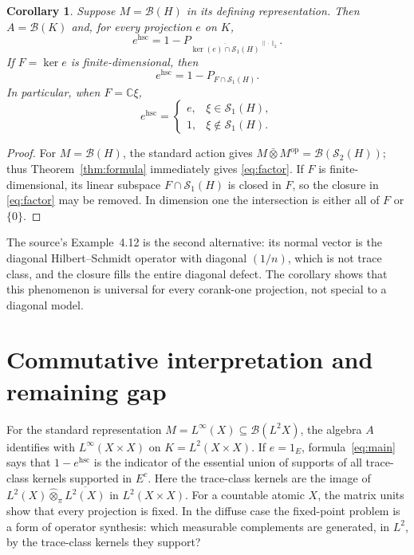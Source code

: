 \documentclass[11pt]{article}
\newtheorem{corollary}[theorem]{Corollary}
\newcommand{\HS}{\mathcal S_2}
\newcommand{\TC}{\mathcal S_1}
\begin{document}
\begin{corollary}\label{cor:factor}
Suppose $M=\mathcal B(H)$ in its defining representation.  Then
$A=\mathcal B(K)$ and, for every projection $e$ on $K$,
\begin{equation}\label{eq:factor}
 e^{\mathrm{hsc}}
 =1-P_{\overline{\ker(e)\cap\TC(H)}^{\,\|\cdot\|_2}}.
\end{equation}
If $F=\ker e$ is finite-dimensional, then
\begin{equation}\label{eq:finite}
                  e^{\mathrm{hsc}}=1-P_{F\cap\TC(H)}.
\end{equation}
In particular, when $F=\mathbb C\xi$,
\[
 e^{\mathrm{hsc}}=
 \begin{cases}
 e,&\xi\in\TC(H),\\
 1,&\xi\notin\TC(H).
 \end{cases}
\]
\end{corollary}

\begin{proof}
For $M=\mathcal B(H)$, the standard action gives
$M\bar\otimes M^{\mathrm{op}}=\mathcal B(\HS(H))$; thus
Theorem~\ref{thm:formula} immediately gives \eqref{eq:factor}.  If $F$ is
finite-dimensional, its linear subspace $F\cap\TC(H)$ is closed in $F$,
so the closure in \eqref{eq:factor} may be removed.  In dimension one the
intersection is either all of $F$ or $\{0\}$.
\end{proof}

The source's Example~4.12 is the second alternative: its normal vector is
the diagonal Hilbert--Schmidt operator with diagonal $(1/n)$, which is not
trace class, and the closure fills the entire diagonal defect.  The
corollary shows that this phenomenon is universal for every corank-one
projection, not special to a diagonal model.

\section{Commutative interpretation and remaining gap}

For the standard representation $M=L^\infty(X)\subseteq\mathcal B(L^2X)$,
the algebra $A$ identifies with $L^\infty(X\times X)$ on
$K=L^2(X\times X)$.  If $e=1_E$, formula~\eqref{eq:main} says that
$1-e^{\mathrm{hsc}}$ is the indicator of the essential union of supports
of all trace-class kernels supported in $E^c$.  Here the trace-class
kernels are the image of
\(L^2(X)\widehat\otimes_\pi\overline{L^2(X)}\) in $L^2(X\times X)$.
For a countable atomic $X$, the matrix units show that every projection is
fixed.  In the diffuse case the fixed-point problem is a form of operator
synthesis: which measurable complements are generated, in $L^2$, by the
trace-class kernels they support?
\end{document}
